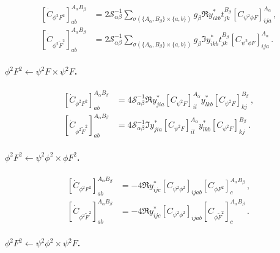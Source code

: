 \begin{align}
    \left[\dot C_{\phi^2 F^2}\right]_{ab}^{A_\alpha B_\beta} &= 2 \mathcal S_{\alpha\beta}^{-1} \sum_{\sigma(\{A_\alpha,B_\beta\} \times \{a,b\})}
     g_\beta \Re{
     y^*_{ikb}t^{B_\beta}_{jk}
    \left[C_{\psi^2\phi F}\right]_{ija}^{A_\alpha}
    }
    \,,\label{phi2F2_psi2phiF}
    \\
    \left[\dot C_{\phi^2 \widetilde F^2}\right]_{ab}^{A_\alpha B_\beta} &= 2 \mathcal S_{\alpha\beta}^{-1} \sum_{\sigma(\{A_\alpha,B_\beta\} \times \{a,b\})}
     g_\beta \Im{
     y^*_{ikb}t^{B_\beta}_{jk}
    \left[C_{\psi^2\phi F}\right]_{ija}^{A_\alpha}
    }
    \,.\label{phi2Ftilde2_psi2phiF}
\end{align}

\paragraph{$\phi^2 F^2\leftarrow \psi^2 F \times \psi^2 F$.}

\begin{align}
    \left[\dot C_{\phi^2 F^2}\right]_{ab}^{A_\alpha B_\beta} &= 4 \mathcal S_{\alpha\beta}^{-1} \Re{y^*_{jia} \left[C_{\psi^2 F}\right]_{il}^{A_\alpha} y^*_{lkb} \left[C_{\psi^2 F}\right]_{kj}^{B_\beta}} \,,\label{phi2F2_psi2Fxpsi2F}
    \\
    \left[\dot C_{\phi^2 \widetilde F^2}\right]_{ab}^{A_\alpha B_\beta} &= 4 \mathcal S_{\alpha\beta}^{-1} \Im{y^*_{jia} \left[C_{\psi^2 F}\right]_{il}^{A_\alpha} y^*_{lkb} \left[C_{\psi^2 F}\right]_{kj}^{B_\beta}} \,.\label{phi2Ftilde2_psi2Fxpsi2F}
\end{align}

\paragraph{$\phi^2F^2 \leftarrow \psi^2\phi^2 \times \phi F^2$.}

\begin{align}
    \left[\dot C_{\phi^2 F^2}\right]_{ab}^{A_\alpha B_\beta} &= -4 \Re{y_{ijc}^* \left[C_{\psi^2\phi^2}\right]_{ijab}} \left[ C_{\phi F^2}\right]_{c}^{A_\alpha B_\beta}\,,
    \\
    \left[\dot C_{\phi^2 \widetilde F^2}\right]_{ab}^{A_\alpha B_\beta} &= -4 \Re{y_{ijc}^* \left[C_{\psi^2\phi^2}\right]_{ijab}} \left[ C_{\phi \widetilde F^2}\right]_{c}^{A_\alpha B_\beta}\,.
\end{align}

\paragraph{$\phi^2F^2 \leftarrow \psi^2\phi^2 \times \psi^2 F$.}

